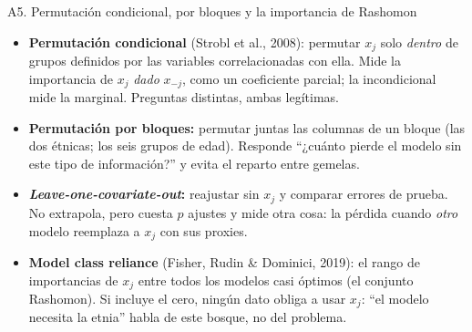 \documentclass{beamer}
\newcommand{\1}{\mathbb{I}}
\begin{document}
\begin{frame}{A5. Permutación condicional, por bloques y la importancia de Rashomon}
\small
\begin{itemize}\itemsep2pt
  \item \textbf{Permutación condicional} (Strobl et al., 2008): permutar $x_j$ solo \emph{dentro} de grupos definidos por las variables correlacionadas con ella. Mide la importancia de $x_j$ \emph{dado} $x_{-j}$, como un coeficiente parcial; la incondicional mide la marginal. Preguntas distintas, ambas legítimas.
  \item \textbf{Permutación por bloques:} permutar juntas las columnas de un bloque (las dos étnicas; los seis grupos de edad). Responde ``¿cuánto pierde el modelo sin este tipo de información?'' y evita el reparto entre gemelas.
  \item \textbf{\emph{Leave-one-covariate-out}:} reajustar sin $x_j$ y comparar errores de prueba. No extrapola, pero cuesta $p$ ajustes y mide otra cosa: la pérdida cuando \emph{otro} modelo reemplaza a $x_j$ con sus proxies.
  \item \textbf{Model class reliance} (Fisher, Rudin \& Dominici, 2019): el rango de importancias de $x_j$ entre todos los modelos casi óptimos (el conjunto Rashomon). Si incluye el cero, ningún dato obliga a usar $x_j$: ``el modelo necesita la etnia'' habla de este bosque, no del problema.
\end{itemize}
\end{frame}

\end{document}
